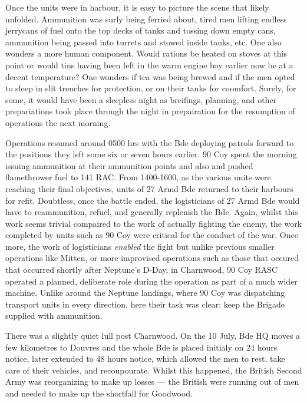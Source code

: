 \documentclass[noraggedright]{turabian-researchpaper}
\begin{document}
Once the units were in harbour, it is easy to picture the scene that likely
unfolded.  Ammunition was surly being ferried about, tired men lifting 
endless jerrycans of fuel onto the top decks of tanks and tossing down empty
cans, ammunition being passed into turrets and stowed inside tanks, etc. 
One also wonders a more human
component.  Would rations be heated on stoves at this point or would tins 
having been left in the warm engine bay earlier now be at a decent 
temperature?  One wonders if tea was being brewed and if the men opted to sleep
in slit trenches for protection, or on their tanks for coomfort.  Surely, for
some, it would have been a sleepless night as breifings, planning, and other
prepariations took place through the night in  prepairation for the resumption 
of operations the next morning.

Operations resumed around 0500 hrs with the Bde deploying patrols forward to 
the positions they left some six or seven hours earlier.\autocite[9 July 1944]
{1318wd}  90 Coy spent the morning issuing ammunition at their ammunition 
points and also and pushed flamethrower fuel to 141 RAC.  
From 1400-1600, as the various units were reaching their final objectives, 
units of 27 Armd Bde returned to their harbours for refit.  Doubtless, once 
the battle ended, the logisticians of 27 Armd Bde would have to reammunition, 
refuel, and generally replenish the Bde.\autocite[9 July 1944]{90wd}  Again,
whilst this work seems trivial compaired to the work of actually fighting
the enemy, the work completed by units such as 90 Coy were critical for the
conduct of the war.  Once more, the work of logisticians \textit{enabled} the 
fight but unlike previous smaller operations like Mitten, or more improvised
operations such as those that occured that occurred shortly after Neptune's 
D-Day, in Charnwood, 90 Coy RASC operated a planned, deliberate role during
the operation as part of a much wider machine.  Unlike around the Neptune
landings, where 90 Coy was dispatching transport units in every direction,
here their task was clear:  keep the Brigade supplied with ammunition.

There was a slightly quiet lull post Charnwood.  On the 10 July, Bde
HQ moves a few kilometres to Douvres and the whole Bde is placed initialy on 
24 hours notice, later extended to 48 hours notice, which allowed the men to 
rest, take care of their vehicles, and recoupourate.\autocite[10, 13 July 1944]
{27wd}  
Whilst this happened, the British Second Army was reorganizing to make up 
losses --- the British were running out of men and needed to make up the 
shortfall for Goodwood.
\end{document}
